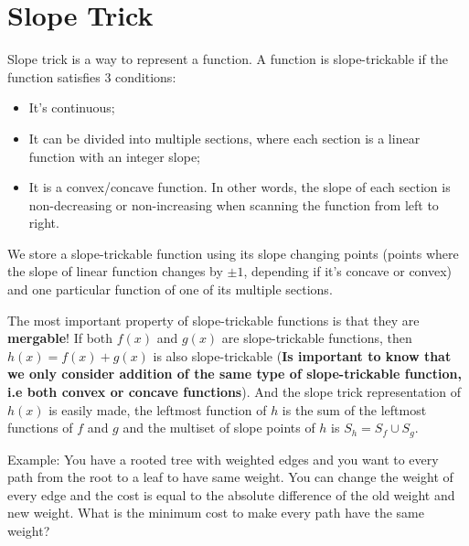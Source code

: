 \section{Slope Trick}
Slope trick is a way to represent a function. A function is slope-trickable if the function satisfies 3 conditions:
\begin{itemize}
    \item It's continuous;
    \item It can be divided into multiple sections, where each section is a linear function with an integer slope;
    \item It is a convex/concave function. In other words, the slope of each section is non-decreasing or non-increasing when scanning the function from left to right.
\end{itemize}

We store a slope-trickable function using its slope changing points (points where the slope of linear function changes by $\pm 1$, depending if it's concave or convex) and one particular function of one of its multiple sections.

The most important property of slope-trickable functions is that they are \textbf{mergable}! If both $f(x)$ and $g(x)$ are slope-trickable functions, then $h(x) = f(x) + g(x)$ is also slope-trickable (\textbf{Is important to know that we only consider addition of the same type of slope-trickable function, i.e both convex or concave functions}). And the slope trick representation of $h(x)$ is easily made, the leftmost function of $h$ is the sum of the leftmost functions of $f$ and $g$ and the multiset of slope points of $h$ is $S_h = S_f \cup S_g$.

Example: You have a rooted tree with weighted edges and you want to every path from the root to a leaf to have same weight. You can change the weight of every edge and the cost is equal to the absolute difference of the old weight and new weight. What is the minimum cost to make every path have the same weight?
